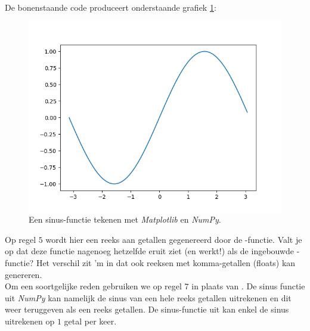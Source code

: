 De bonenstaande code produceert onderstaande grafiek \ref{fig:plot3}:
\begin{figure}[h!]
\centering\includegraphics[scale=0.7]{Pictures/chapter07/sin.png}
\caption{Een sinus-functie tekenen met \textit{Matplotlib} en \textit{NumPy}.}
\label{fig:plot3} 
\end{figure}

Op regel $5$ wordt hier een reeks aan getallen gegenereerd door de -functie. Valt je op dat deze functie nagenoeg hetzelfde eruit ziet (en werkt!) als de ingebouwde -functie? Het verschil zit 'm in dat  ook reeksen met komma-getallen (floats) kan genereren. \\ 
Om een soortgelijke reden gebruiken we op regel $7$  in plaats van . De sinus functie uit \textit{NumPy} kan namelijk de sinus van een hele reeks getallen uitrekenen en dit weer teruggeven als een reeks getallen. De sinus-functie uit  kan enkel de sinus uitrekenen op $1$ getal per keer.
 
\newpage

